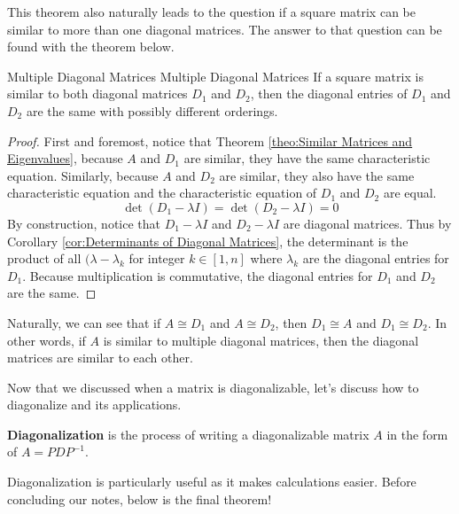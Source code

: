 \documentclass[../main.tex]{subfiles}
\begin{document}
This theorem also naturally leads to the question if a square matrix
can be similar to more than one diagonal matrices. The answer to
that question can be found with the theorem below.

\begin{theorem}{Multiple Diagonal Matrices}
{Multiple Diagonal Matrices}
If a square matrix is similar to both diagonal matrices $D_1$ and
$D_2$, then the diagonal entries of $D_1$ and $D_2$ are the same
with possibly different orderings.
\end{theorem}
\begin{proof}
First and foremost, notice that Theorem \ref{theo:Similar Matrices and
Eigenvalues}, because $A$ and $D_1$ are similar, they have the
same characteristic equation. Similarly, because $A$ and $D_2$ are
similar, they also have the same characteristic equation and the
characteristic equation of $D_1$ and $D_2$ are equal.
\[
\det(D_1 - \lambda I) = \det(D_2 - \lambda I) = 0
\]
By construction, notice that $D_1 - \lambda I$ and $D_2 - \lambda I$
are diagonal matrices. Thus by Corollary \ref{cor:Determinants of
Diagonal Matrices}, the determinant is the product of all $(\lambda
- \lambda_k$ for integer $k \in [1, n]$ where $\lambda_k$ are the
diagonal entries for $D_1$. Because multiplication is commutative,
the diagonal entries for $D_1$ and $D_2$ are the same.
\end{proof}

Naturally, we can see that if $A \cong D_1$ and $A \cong D_2$,
then $D_1 \cong A$ and $D_1 \cong D_2$. In other words, if $A$ is
similar to multiple diagonal matrices, then the diagonal matrices
are similar to each other.

Now that we discussed when a matrix is diagonalizable, let's discuss
how to diagonalize and its applications.

\begin{definition}
\textbf{Diagonalization} is the process of writing a diagonalizable
matrix $A$ in the form of $A = P D P^{-1}$.
\end{definition}

Diagonalization is particularly useful as it makes calculations
easier. Before concluding our notes, below is the final theorem!
\end{document}
